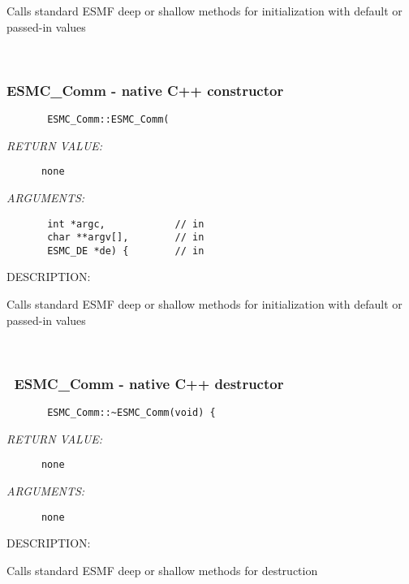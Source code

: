        Calls standard ESMF deep or shallow methods for initialization
        with default or passed-in values
   
 
\mbox{}\hrulefill\ 
 
\subsubsection{ESMC\_Comm - native C++ constructor}


  
\begin{verbatim}       ESMC_Comm::ESMC_Comm(\end{verbatim}{\em RETURN VALUE:}
\begin{verbatim}      none\end{verbatim}{\em ARGUMENTS:}
\begin{verbatim}       int *argc,            // in
       char **argv[],        // in
       ESMC_DE *de) {        // in\end{verbatim}
{\sf DESCRIPTION:\\ }


        Calls standard ESMF deep or shallow methods for initialization
        with default or passed-in values
   
 
\mbox{}\hrulefill\ 
 
\subsubsection{~ESMC\_Comm - native C++ destructor}


  
\begin{verbatim}       ESMC_Comm::~ESMC_Comm(void) {\end{verbatim}{\em RETURN VALUE:}
\begin{verbatim}      none\end{verbatim}{\em ARGUMENTS:}
\begin{verbatim}      none\end{verbatim}
{\sf DESCRIPTION:\\ }


        Calls standard ESMF deep or shallow methods for destruction
   
 
